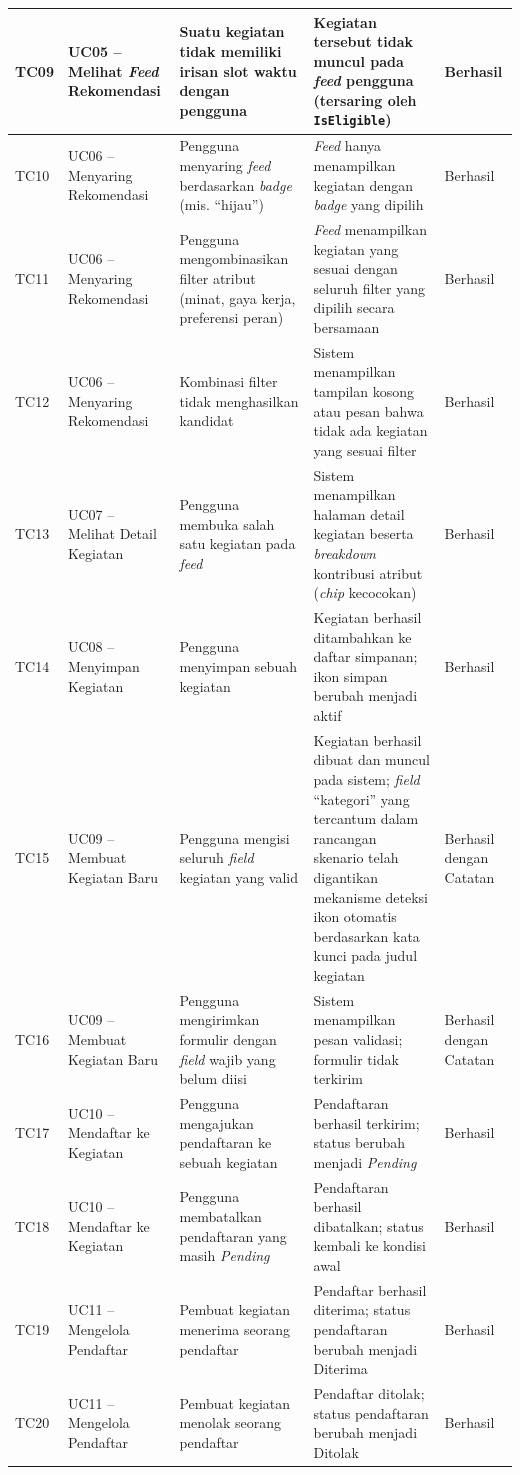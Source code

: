 \begin{longtable}{p{} p{} p{} p{} p{}}
\midrule
TC09 & UC05 – Melihat \emph{Feed} Rekomendasi & Suatu kegiatan tidak memiliki irisan slot waktu dengan pengguna & Kegiatan tersebut tidak muncul pada \emph{feed} pengguna (tersaring oleh \texttt{IsEligible}) & Berhasil \\
\midrule
TC10 & UC06 – Menyaring Rekomendasi & Pengguna menyaring \emph{feed} berdasarkan \emph{badge} (mis. ``hijau'') & \emph{Feed} hanya menampilkan kegiatan dengan \emph{badge} yang dipilih & Berhasil \\
\midrule
TC11 & UC06 – Menyaring Rekomendasi & Pengguna mengombinasikan filter atribut (minat, gaya kerja, preferensi peran) & \emph{Feed} menampilkan kegiatan yang sesuai dengan seluruh filter yang dipilih secara bersamaan & Berhasil \\
\midrule
TC12 & UC06 – Menyaring Rekomendasi & Kombinasi filter tidak menghasilkan kandidat & Sistem menampilkan tampilan kosong atau pesan bahwa tidak ada kegiatan yang sesuai filter & Berhasil \\
\midrule
TC13 & UC07 – Melihat Detail Kegiatan & Pengguna membuka salah satu kegiatan pada \emph{feed} & Sistem menampilkan halaman detail kegiatan beserta \emph{breakdown} kontribusi atribut (\emph{chip} kecocokan) & Berhasil \\
\midrule
TC14 & UC08 – Menyimpan Kegiatan & Pengguna menyimpan sebuah kegiatan & Kegiatan berhasil ditambahkan ke daftar simpanan; ikon simpan berubah menjadi aktif & Berhasil \\
\midrule
TC15 & UC09 – Membuat Kegiatan Baru & Pengguna mengisi seluruh \emph{field} kegiatan yang valid & Kegiatan berhasil dibuat dan muncul pada sistem; \emph{field} ``kategori'' yang tercantum dalam rancangan skenario telah digantikan mekanisme deteksi ikon otomatis berdasarkan kata kunci pada judul kegiatan & Berhasil dengan Catatan \\
\midrule
TC16 & UC09 – Membuat Kegiatan Baru & Pengguna mengirimkan formulir dengan \emph{field} wajib yang belum diisi & Sistem menampilkan pesan validasi; formulir tidak terkirim & Berhasil dengan Catatan \\
\midrule
TC17 & UC10 – Mendaftar ke Kegiatan & Pengguna mengajukan pendaftaran ke sebuah kegiatan & Pendaftaran berhasil terkirim; status berubah menjadi \emph{Pending} & Berhasil \\
\midrule
TC18 & UC10 – Mendaftar ke Kegiatan & Pengguna membatalkan pendaftaran yang masih \emph{Pending} & Pendaftaran berhasil dibatalkan; status kembali ke kondisi awal & Berhasil \\
\midrule
TC19 & UC11 – Mengelola Pendaftar & Pembuat kegiatan menerima seorang pendaftar & Pendaftar berhasil diterima; status pendaftaran berubah menjadi Diterima & Berhasil \\
\midrule
TC20 & UC11 – Mengelola Pendaftar & Pembuat kegiatan menolak seorang pendaftar & Pendaftar ditolak; status pendaftaran berubah menjadi Ditolak & Berhasil \\
\end{longtable}

